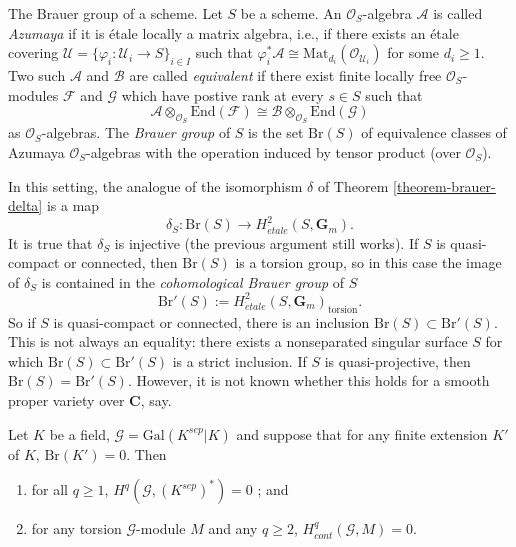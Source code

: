 \noindent
The Brauer group of a scheme.
Let $S$ be a scheme. An $\mathcal{O}_S$-algebra $\mathcal{A}$ is called
{\it Azumaya} if it is \'etale locally a matrix algebra, i.e., if there
exists an \'etale covering $\mathcal{U} = \{ \varphi_i : \mathcal{U}_i \to S
\}_{i \in I}$ such that $\varphi_i^*\mathcal{A} \cong
\text{Mat}_{d_i}(\mathcal{O}_{\mathcal{U}_i})$ for some $d_i \geq 1$. Two such
$\mathcal{A}$ and $\mathcal{B}$ are called {\it equivalent} if there exist
finite locally free $\mathcal{O}_S$-modules $\mathcal{F}$ and $\mathcal{G}$
which have postive rank at every $s \in S$ such that
$$
\mathcal{A} \otimes_{\mathcal{O}_S} \text{End}(\mathcal{F})
\cong
\mathcal{B} \otimes_{\mathcal{O}_S} \text{End}(\mathcal{G})
$$
as $\mathcal{O}_S$-algebras. The {\it Brauer group} of
$S$ is the set $\text{Br}(S)$ of equivalence classes of Azumaya
$\mathcal{O}_S$-algebras with the operation induced by tensor product (over
$\mathcal{O}_S$).

\medskip\noindent
In this setting, the analogue of the isomorphism $\delta$ of
Theorem \ref{theorem-brauer-delta}
is a map
$$
\delta_S: \text{Br}(S) \to H_{\acute{e}tale}^2(S, \mathbf{G}_m).
$$
It is true that $\delta_S$ is injective (the previous argument still works). If
$S$ is quasi-compact or connected, then $\text{Br}(S)$ is a torsion group, so
in this case the image of $\delta_S$ is contained in the {\it cohomological
Brauer group} of $S$
$$
\text{Br}'(S) := H_{\acute{e}tale}^2(S, \mathbf{G}_m)_\text{torsion}.
$$
So if $S$ is quasi-compact or connected, there is an inclusion $\text{Br}(S)
\subset \text{Br}'(S)$. This is not always an equality: there exists a
nonseparated singular surface $S$ for which $\text{Br}(S) \subset
\text{Br}'(S)$ is a strict inclusion. If $S$ is quasi-projective, then
$\text{Br}(S) = \text{Br}'(S)$. However, it is not known whether this holds for
a smooth proper variety over $\mathbf{C}$, say.


\begin{proposition}
\label{proposition-serre-galois}
Let $K$ be a field, $\mathcal{G} = \text{Gal}(K^{sep}|K)$ and suppose that for
any finite extension $K'$ of $K$, $\text{Br}(K') = 0$. Then
\begin{enumerate}
\item
for all $ q \geq 1$, $H^q (\mathcal{G}, (K^{sep})^*) = 0$ ; and
\item
for any torsion $\mathcal{G}$-module $M$ and any $q \geq 2$, $H_{cont}^q
(\mathcal{G}, M) = 0$.
\end{enumerate}
\end{proposition}

